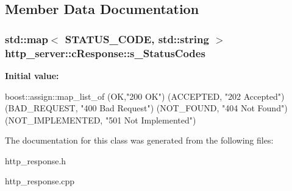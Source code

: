 \subsection{Member Data Documentation}
\hypertarget{classhttp__server_1_1cResponse_a173245993bbac50f72d5a8528526cc26}{
\subsubsection[{s\-\_\-\-Status\-Codes}]{\setlength{\rightskip}{0pt plus 5cm}std\-::map$<$ S\-T\-A\-T\-U\-S\-\_\-\-C\-O\-D\-E, std\-::string $>$ http\-\_\-server\-::c\-Response\-::s\-\_\-\-Status\-Codes\hspace{0.3cm}{\ttfamily [static]}}}\label{classhttp__server_1_1cResponse_a173245993bbac50f72d5a8528526cc26}
{\bfseries Initial value\-:}
\begin{DoxyCode}
 boost::assign::map\_list\_of
        (OK,\textcolor{stringliteral}{"200 OK"})
        (ACCEPTED, \textcolor{stringliteral}{"202 Accepted"})
        (BAD\_REQUEST, \textcolor{stringliteral}{"400 Bad Request"})
        (NOT\_FOUND, \textcolor{stringliteral}{"404 Not Found"})
        (NOT\_IMPLEMENTED, \textcolor{stringliteral}{"501 Not Implemented"})
\end{DoxyCode}


The documentation for this class was generated from the following files\-:\begin{DoxyCompactItemize}
\item 
http\-\_\-response.\-h\item 
http\-\_\-response.\-cpp\end{DoxyCompactItemize}
